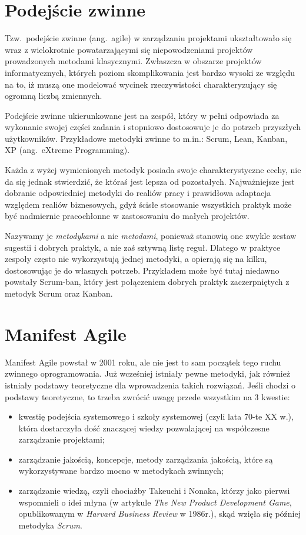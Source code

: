 \section{Podejście zwinne}

Tzw.\ podejście zwinne (ang.\ agile) w zarządzaniu projektami ukształtowało się
wraz z wielokrotnie powatarzającymi się niepowodzeniami projektów prowadzonych
metodami klasycznymi. Zwłaszcza w obszarze projektów informatycznych, których
poziom skomplikowania jest bardzo wysoki ze względu na to, iż muszą one modelować
wycinek rzeczywistości charakteryzujący się ogromną liczbą zmiennych.

Podejście zwinne ukierunkowane jest na zespół, który w pełni odpowiada za wykonanie swojej części
zadania i stopniowo dostosowuje je do potrzeb przyszłych użytkowników.
Przykładowe metodyki zwinne to m.in.: Scrum, Lean, Kanban, XP (ang.\ eXtreme Programming).

Każda z wyżej wymienionych metodyk posiada swoje charakterystyczne cechy,
nie da się jednak stwierdzić, że któraś jest lepsza od pozostałych.
Najważniejsze jest dobranie odpowiedniej metodyki do realiów pracy
i prawidłowa adaptacja względem realiów biznesowych,
gdyż ścisłe stosowanie wszystkich praktyk może być nadmiernie pracochłonne
w zastosowaniu do małych projektów.

Nazywamy je \textit{metodykami} a nie \textit{metodami}, ponieważ stanowią one
zwykle zestaw sugestii i dobrych praktyk, a nie zaś sztywną listę reguł.
Dlatego w praktyce zespoły często nie wykorzystują jednej metodyki, a opierają się na kilku,
dostosowując je do własnych potrzeb.
Przykładem może być tutaj niedawno powstały Scrum-ban, który jest połączeniem
dobrych praktyk zaczerpniętych z metodyk Scrum oraz Kanban.
~\cite{Wolf_2012}


\section{Manifest Agile}

Manifest Agile powstał w 2001 roku, ale nie jest to sam początek tego ruchu zwinnego oprogramowania.
Już wcześniej istniały pewne metodyki, jak również istniały podstawy teoretyczne
dla wprowadzenia takich rozwiązań. Jeśli chodzi o podstawy teoretyczne,
to trzeba zwrócić uwagę przede wszystkim na 3 kwestie:
\begin{itemize}
	\item kwestię podejścia systemowego i szkoły systemowej (czyli lata 70-te XX w.),
	która dostarczyła dość znaczącej wiedzy pozwalającej na współczesne zarządzanie projektami;
	\item zarządzanie jakością, koncepcje, metody zarządzania jakością,
	które są wykorzystywane bardzo mocno w metodykach zwinnych;
	\item zarządzanie wiedzą, czyli chociażby Takeuchi i Nonaka,
	którzy jako pierwsi wspomnieli o idei młyna (w artykule \textit{The New Product Development Game},
	opublikowanym w \textit{Harvard Business Review} w 1986r.), skąd wzięła się później metodyka \textit{Scrum}.
\end{itemize}

